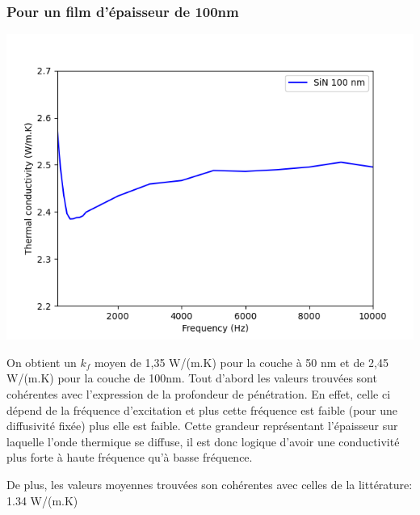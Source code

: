 \documentclass[10pt,a4paper]{report}
\begin{document}
\subsubsection{Pour un film d'épaisseur de 100nm}
\begin{center}
\includegraphics[scale=0.7]{kappa100nm.png} 
\end{center}
On obtient un $k_{f}$ moyen de 1,35 W/(m.K) pour la couche à 50 nm et de 2,45 W/(m.K) pour la couche de 100nm.
\newline
\newline
Tout d'abord les valeurs trouvées sont cohérentes avec l'expression de la profondeur de pénétration. En effet, celle ci dépend de la fréquence d'excitation et plus cette fréquence est faible (pour une diffusivité fixée) plus elle est faible. Cette grandeur représentant l'épaisseur sur laquelle l'onde thermique se diffuse, il est donc logique d'avoir une conductivité plus forte à haute fréquence qu'à basse fréquence.

De plus, les valeurs moyennes trouvées son cohérentes avec celles de la littérature: 1.34 W/(m.K)
\end{document}

